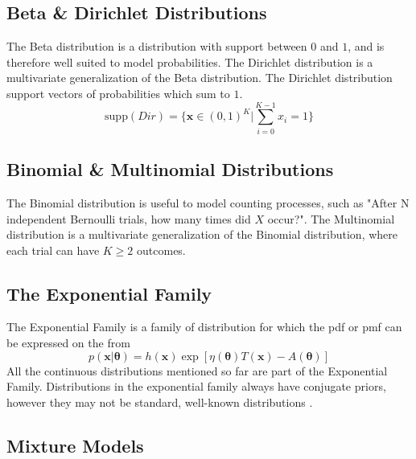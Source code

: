 \subsection{Beta \& Dirichlet Distributions}
The Beta distribution is a distribution with support between $0$ and $1$, and is therefore well suited to model probabilities. The Dirichlet distribution is a multivariate generalization of the Beta distribution. The Dirichlet distribution support vectors of probabilities which sum to $1$.
\begin{equation}
    \text{supp}(Dir) = \{\boldsymbol{x} \in (0, 1)^K | \sum_{i=0}^{K-1} x_i = 1\} 
\end{equation} 
\subsection{Binomial \& Multinomial Distributions}
The Binomial distribution is useful to model counting processes, such as "After N independent Bernoulli trials, how many times did $X$ occur?". The Multinomial distribution is a multivariate generalization of the Binomial distribution, where each trial can have $K \geq 2$ outcomes. 


\subsection{The Exponential Family}
The Exponential Family is a family of distribution for which the \acrshort{pdf} or \acrshort{pmf} can be expressed on the from
\begin{equation}
    p(\mathbf{x} | \boldsymbol{\theta}) = h(\mathbf{x}) \exp[\eta(\boldsymbol{\theta}) T(\mathbf{x}) - A(\boldsymbol{\theta})]
\end{equation}
All the continuous distributions mentioned so far are part of the Exponential Family. Distributions in the exponential family always have conjugate priors, however they may not be standard, well-known distributions \cite{murphy}. 

\subsection{Mixture Models}


